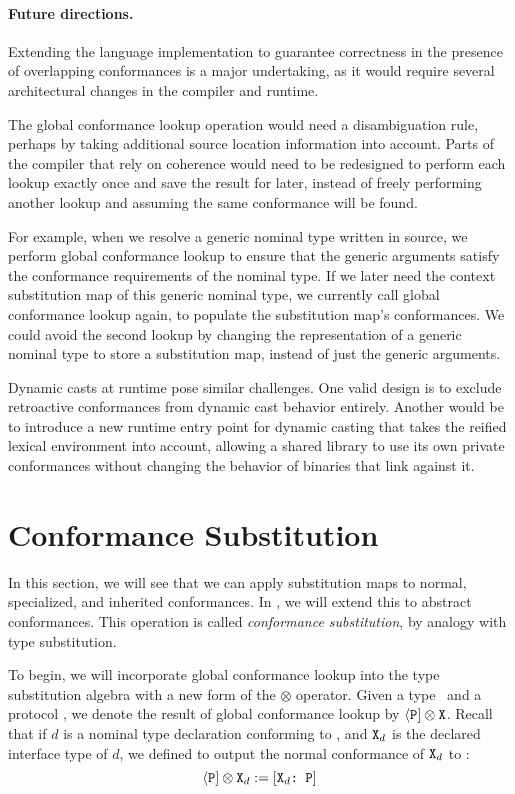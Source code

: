 \documentclass[../generics]{subfiles}
\begin{document}
\paragraph{Future directions.} Extending the language implementation to guarantee correctness in the presence of overlapping conformances is a major undertaking, as it would require several architectural changes in the compiler and runtime.

The global conformance lookup operation would need a disambiguation rule, perhaps by taking additional source location information into account. Parts of the compiler that rely on coherence would need to be redesigned to perform each lookup exactly once and save the result for later, instead of freely performing another lookup and assuming the same conformance will be found.

For example, when we resolve a generic nominal type written in source, we perform global conformance lookup to ensure that the generic arguments satisfy the conformance requirements of the nominal type. If we later need the context substitution map of this generic nominal type, we currently call global conformance lookup again, to populate the substitution map's conformances. We could avoid the second lookup by changing the representation of a generic nominal type to store a substitution map, instead of just the generic arguments.

Dynamic casts at runtime pose similar challenges. One valid design is to exclude retroactive conformances from dynamic cast behavior entirely. Another would be to introduce a new runtime entry point for dynamic casting that takes the reified lexical environment into account, allowing a shared library to use its own private conformances without changing the behavior of binaries that link against it.

\section{Conformance Substitution}\label{conformance subst}

In this section, we will see that we can apply substitution maps to normal, specialized, and inherited conformances. In , we will extend this to abstract conformances. This operation is called \emph{conformance substitution}, by analogy with type substitution.

To begin, we will incorporate global conformance lookup into the type substitution algebra with a new form of the \index{$\otimes$}$\otimes$ operator. Given a type \tX\ and a protocol \tP, we denote the result of global conformance lookup by $\langle\texttt{P}] \otimes \texttt{X}$. Recall that if $d$ is a nominal type declaration conforming to \tP, and $\texttt{X}_d$ is the declared interface type of $d$, we defined  to output the normal conformance of $\texttt{X}_d$ to \tP:
\[\langle\texttt{P}]\otimes\texttt{X}_d := [\texttt{$\texttt{X}_d$:~P}]\]
\end{document}
